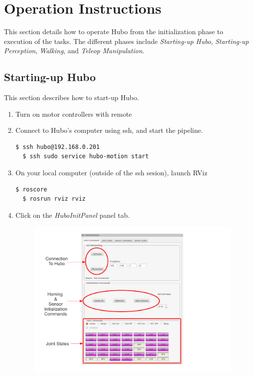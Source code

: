 \documentclass[letterpaper, 10 pt]{report}
\begin{document}
\pagebreak
\chapter{Operation Instructions}\label{chap:operating-instructions}
This section details how to operate Hubo from the initialization phase to execution of the tasks. The different phases include \textit{Starting-up Hubo}, \textit{Starting-up Perception}, \textit{Walking}, and \textit{Teleop Manipulation}.
\section{Starting-up Hubo}
This section describes how to start-up Hubo.
\begin{enumerate}
  \item Turn on motor controllers with remote
  \item Connect to Hubo's computer using ssh, and start the pipeline.
  \begin{lstlisting}[language=bash]
  $ ssh hubo@192.168.0.201
  $ ssh sudo service hubo-motion start
  \end{lstlisting}
  \item On your local computer (outside of the ssh sesion), launch RViz
  \begin{lstlisting}[language=bash]
  $ roscore
  $ rosrun rviz rviz
  \end{lstlisting}
  \item Click on the \textit{HuboInitPanel} panel tab.
  \begin{figure}[ht]
    \centering
    \includegraphics[width=15.0cm]{figures/hubo-init.pdf}

\end{figure}
\end{enumerate}
\end{document}
